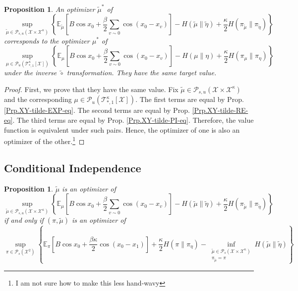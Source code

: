 \documentclass[12pt]{article}
\newtheorem{proposition}[theorem]{Proposition}
\numberwithin{equation}{section}
\begin{document}
\begin{proposition}
    An optimizer $\widetilde{\mu}^*$ of
    \begin{equation*}
        \sup_{\widetilde{\mu}\in\mathcal{P}_{s, u}(\mathcal{X}\times\mathcal{X}^\kappa)}\left\{\mathbb{E}_{\widetilde{\mu}}\left[B\cos x_0 + \frac\beta2\sum_{v\sim 0}\cos(x_0-x_v)\right] - H(\widetilde{\mu}\|\widetilde{\eta}) + \frac\kappa2 H(\pi_{\widetilde\mu}\|\pi_{\widetilde\eta})\right\}
    \end{equation*}
    corresponds to the optimizer $\mu^*$ of
    \begin{equation*}
        \sup_{\mu\in\mathcal{P}_u(\mathcal{T}^\kappa_{*,1}[\mathcal{X}])}\left\{\mathbb{E}_\mu\left[B\cos x_0 + \frac\beta2\sum_{v\sim 0}\cos(x_0-x_v)\right] - H(\mu\|\eta) + \frac\kappa2 H(\pi_\mu\|\pi_\eta)\right\}
    \end{equation*}
    under the inverse $\widetilde{\circ}$ transformation. They have the same target value.
\end{proposition}

\begin{proof}
    First, we prove that they have the same value. Fix $\widetilde{\mu}\in\mathcal{P}_{s, u}(\mathcal{X}\times\mathcal{X}^\kappa)$ and the
    corresponding $\mu\in\mathcal{P}_u(\mathcal{T}^\kappa_{*,1}[\mathcal{X}])$. The first terms are equal by Prop. \ref{Prp.XY-tilde-EXP-eq}. The
    second terms are equal by Prop. \ref{Prp.XY-tilde-RE-eq}. The third terms are equal by Prop. \ref{Prp.XY-tilde-PI-eq}. Therefore, the value
    function is equivalent under such pairs. Hence, the optimizer of one is also an optimizer of the other.\footnote{I am not sure how to make this
        less hand-wavy}
\end{proof}

\subsection{Conditional Independence}

\begin{proposition}
    $\widetilde{\mu}$ is an optimizer of
    \begin{equation}\label{Eq.XY-target-no-pi}
        \sup_{\widetilde{\mu}\in\mathcal{P}_{s, u}(\mathcal{X}\times\mathcal{X}^\kappa)}\left\{\mathbb{E}_\mu\left[B\cos x_0 + \frac\beta2\sum_{v\sim 0}\cos(x_0-x_v)\right] - H(\widetilde{\mu}\|\widetilde{\eta}) + \frac\kappa2 H(\pi_{\widetilde\mu}\|\pi_{\widetilde\eta})\right\}
    \end{equation}
    if and only if $(\pi, \widetilde{\mu})$ is an optimizer of
    \begin{equation}\label{Eq.XY-target-with-pi}
        \sup_{\pi\in\mathcal{P}_s(\mathcal{X}^2)}\left\{\mathbb{E}_\pi\left[B\cos x_0 + \frac{\beta\kappa}2\cos(x_0-x_1)\right] + \frac\kappa2
        H(\pi\|\pi_\eta) - \inf_{\substack{\widetilde\mu\in\mathcal{P}_{s}(\mathcal{X}\times\mathcal{X}^\kappa) \\ \pi_{\widetilde\mu}=\pi}} H(\widetilde\mu\|\widetilde\eta)\right\}
    \end{equation}
\end{proposition}
\end{document}
